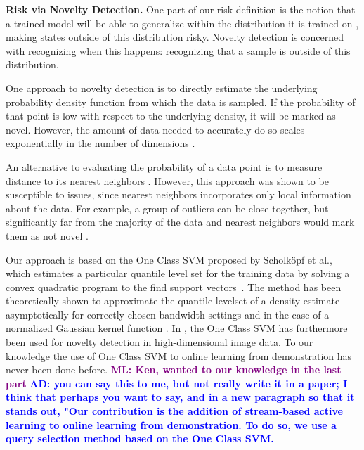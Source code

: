 \documentclass[10pt, conference]{ieeeconf}      %
\newcommand{\adnote}[1]{\ifthenelse{\boolean{include-notes}}%
 {\textcolor{blue}{\textbf{AD: #1}}}{}}
\newcommand{\mlnote}[1]{\ifthenelse{\boolean{include-notes}}%
 {\textcolor{purple}{\textbf{ML: #1}}}{}}
\begin{document}
\noindent\textbf{Risk via Novelty Detection.}
One part of our risk definition is the notion that a trained model will be able to generalize within the distribution it is
trained on \cite{tokdar2010importance}, making states outside of this distribution risky. Novelty detection \cite{hodge2004survey} is concerned with recognizing when this happens: recognizing that a sample is outside of this distribution.

One approach to novelty detection is to directly estimate the underlying probability density function from which the data is sampled. If the probability of that point is low with respect to the underlying density, it will be marked as novel. However, the amount of data needed to accurately do so scales exponentially in the number of dimensions \cite{nadaraya1964estimating}.

An alternative to evaluating the probability of a data point is to measure distance to its nearest neighbors \cite{knox1998algorithms}. However, this approach was shown to be
susceptible to issues, since nearest neighbors  incorporates only local information about the data. For example, a group of outliers can be close together, but significantly far from the majority of the data and nearest neighbors would mark them as not novel \cite{hodge2004survey}.

Our approach is based on the One Class SVM proposed by Scholk{\"o}pf et al., which estimates a particular quantile level set for the training data by solving a convex quadratic program  to the find support
vectors~\cite{scholkopf2001estimating}. The method has been theoretically shown to approximate the quantile levelset of a density estimate
asymptotically for correctly chosen bandwidth settings and in the case of a normalized Gaussian kernel function \cite{vert2006consistency}. 
In \cite{liu2014unsupervised}, the One Class SVM has furthermore been used for novelty detection in high-dimensional image data. To our knowledge the use of One Class SVM to online learning from demonstration has never been done before. \mlnote{Ken, wanted to our knowledge in the last part} \adnote{you can say this to me, but not really write it in a paper; I think that perhaps you want to say, and in a new paragraph so that it stands out, "Our contribution is the addition of stream-based active learning to online learning from demonstration. To do so, we use a query selection method based on the One Class SVM.}
\end{document}
